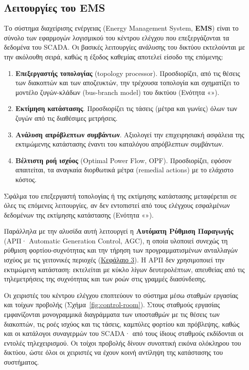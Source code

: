 \subsection{Λειτουργίες του EMS}

Το σύστημα διαχείρισης ενέργειας (Energy Management System, \textbf{EMS}) είναι το σύνολο των
εφαρμογών λογισμικού του κέντρου ελέγχου που επεξεργάζονται τα δεδομένα του SCADA. Οι βασικές λειτουργίες ανάλυσης του δικτύου εκτελούνται με την
ακόλουθη σειρά, καθώς η έξοδος καθεμίας αποτελεί είσοδο της επόμενης:

\begin{enumerate}
\item \textbf{Επεξεργαστής τοπολογίας} (topology processor). Προσδιορίζει, από τις θέσεις
      των διακοπτών και των αποζευκτών, την τρέχουσα τοπολογία και σχηματίζει το μοντέλο
      ζυγών-κλάδων (bus-branch model) του δικτύου (Ενότητα «»).
\item \textbf{Εκτίμηση κατάστασης}. Προσδιορίζει τις τάσεις (μέτρα και γωνίες) όλων των
      ζυγών από τις διαθέσιμες μετρήσεις.
\item \textbf{Ανάλυση απρόβλεπτων συμβάντων}. Αξιολογεί την επιχειρησιακή ασφάλεια της
      εκτιμώμενης κατάστασης έναντι του καταλόγου απρόβλεπτων συμβάντων.
\item \textbf{Βέλτιστη ροή ισχύος} (Optimal Power Flow, OPF). Προσδιορίζει, εφόσον
      απαιτείται, τα αναγκαία διορθωτικά μέτρα (remedial actions) με το ελάχιστο κόστος.
\end{enumerate}

Σφάλμα του επεξεργαστή τοπολογίας ή της εκτίμησης κατάστασης μεταφέρεται σε όλες τις
επόμενες λειτουργίες, αν δεν εντοπιστεί από τους ελέγχους εσφαλμένων δεδομένων της εκτίμησης
κατάστασης (Ενότητα «»).

Παράλληλα με την αλυσίδα αυτή λειτουργεί η \textbf{Αυτόματη Ρύθμιση Παραγωγής} (ΑΡΠ· Automatic
Generation Control, AGC), η οποία υλοποιεί συνεχώς τη ρύθμιση φορτίου-συχνότητας και την
τήρηση των προγραμματισμένων ανταλλαγών ισχύος με τις γειτονικές περιοχές
(\hyperref[kef-03-theoria]{Κεφάλαιο 3}). Η ΑΡΠ δεν χρησιμοποιεί την εκτιμώμενη κατάσταση:
εκτελείται με κύκλο λίγων δευτερολέπτων, απευθείας από τις τηλεμετρήσεις της συχνότητας και
των ροών στις γραμμές διασύνδεσης.

Οι χειριστές του κέντρου ελέγχου εποπτεύουν το σύστημα μέσω σταθμών εργασίας και τοίχων
προβολής (Σχήμα~\ref{fig:control-room}). Στους σταθμούς εργασίας εμφανίζονται μονογραμμικά
διαγράμματα των υποσταθμών με τις θέσεις των διακοπτών, τις ροές ισχύος και τις τάσεις,
καμπύλες φορτίου και πρόβλεψης, καθώς και οι κατάλογοι συναγερμών του SCADA· από τους ίδιους
σταθμούς εκδίδονται οι εντολές τηλεχειρισμού. Οι τοίχοι προβολής δίνουν συνοπτική εικόνα
ολόκληρου του δικτύου, ώστε όλοι οι χειριστές να έχουν κοινή αντίληψη της κατάστασης του
συστήματος.

